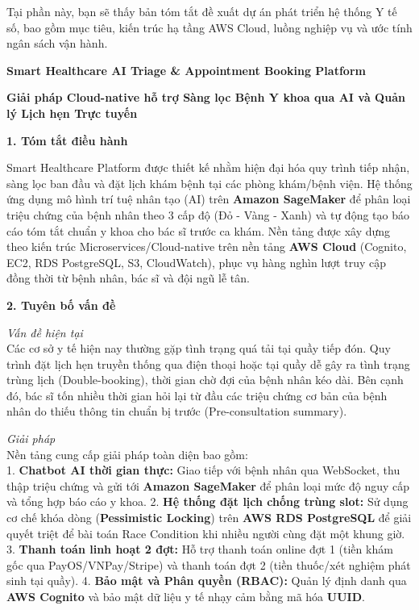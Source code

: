 Tại phần này, bạn sẽ thấy bản tóm tắt đề xuất dự án phát triển hệ thống
Y tế số, bao gồm mục tiêu, kiến trúc hạ tầng AWS Cloud, luồng nghiệp vụ
và ước tính ngân sách vận hành.

\vspace{0.5em}\noindent\textbf{Smart Healthcare AI Triage \& Appointment Booking Platform}

\vspace{0.5em}\noindent\textbf{Giải pháp Cloud-native hỗ trợ Sàng lọc Bệnh Y khoa qua AI và
Quản lý Lịch hẹn Trực tuyến}

\vspace{0.5em}\noindent\textbf{1. Tóm tắt điều hành}

Smart Healthcare Platform được thiết kế nhằm hiện đại hóa quy trình tiếp
nhận, sàng lọc ban đầu và đặt lịch khám bệnh tại các phòng khám/bệnh
viện. Hệ thống ứng dụng mô hình trí tuệ nhân tạo (AI) trên
\textbf{Amazon SageMaker} để phân loại triệu chứng của bệnh nhân theo 3
cấp độ (Đỏ - Vàng - Xanh) và tự động tạo báo cáo tóm tắt chuẩn y khoa
cho bác sĩ trước ca khám. Nền tảng được xây dựng theo kiến trúc
Microservices/Cloud-native trên nền tảng \textbf{AWS Cloud} (Cognito,
EC2, RDS PostgreSQL, S3, CloudWatch), phục vụ hàng nghìn lượt truy cập
đồng thời từ bệnh nhân, bác sĩ và đội ngũ lễ tân.

\vspace{0.5em}\noindent\textbf{2. Tuyên bố vấn đề}

\emph{Vấn đề hiện tại}\\
Các cơ sở y tế hiện nay thường gặp tình trạng quá tải tại quầy tiếp đón.
Quy trình đặt lịch hẹn truyền thống qua điện thoại hoặc tại quầy dễ gây
ra tình trạng trùng lịch (Double-booking), thời gian chờ đợi của bệnh
nhân kéo dài. Bên cạnh đó, bác sĩ tốn nhiều thời gian hỏi lại từ đầu các
triệu chứng cơ bản của bệnh nhân do thiếu thông tin chuẩn bị trước
(Pre-consultation summary).

\emph{Giải pháp}\\
Nền tảng cung cấp giải pháp toàn diện bao gồm:\\
1. \textbf{Chatbot AI thời gian thực:} Giao tiếp với bệnh nhân qua
WebSocket, thu thập triệu chứng và gửi tới \textbf{Amazon SageMaker} để
phân loại mức độ nguy cấp và tổng hợp báo cáo y khoa. 2. \textbf{Hệ
thống đặt lịch chống trùng slot:} Sử dụng cơ chế khóa dòng
(\textbf{Pessimistic Locking}) trên \textbf{AWS RDS PostgreSQL} để giải
quyết triệt để bài toán Race Condition khi nhiều người cùng đặt một
khung giờ. 3. \textbf{Thanh toán linh hoạt 2 đợt:} Hỗ trợ thanh toán
online đợt 1 (tiền khám gốc qua PayOS/VNPay/Stripe) và thanh toán đợt 2
(tiền thuốc/xét nghiệm phát sinh tại quầy). 4. \textbf{Bảo mật và Phân
quyền (RBAC):} Quản lý định danh qua \textbf{AWS Cognito} và bảo mật dữ
liệu y tế nhạy cảm bằng mã hóa \textbf{UUID}.

